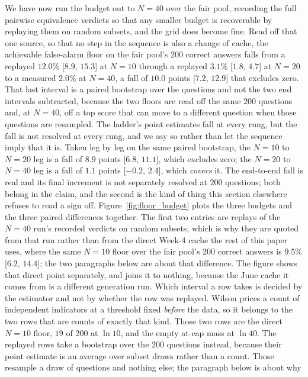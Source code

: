We have now run the budget out to $N{=}40$ over the fair pool, recording the full pairwise
equivalence verdicts so that any smaller budget is recoverable by replaying them on random
subsets, and the grid does become fine. Read off that one source, so that no step in the
sequence is also a change of cache, the achievable false-alarm floor on the fair pool's $200$
correct answers falls from a replayed $12.0\%$ [$8.9$, $15.3$] at $N{=}10$ through a replayed
$3.1\%$ [$1.8$, $4.7$] at $N{=}20$ to a measured $2.0\%$ at $N{=}40$, a fall of
$10.0$ points [$7.2$, $12.9$] that excludes zero. That last interval is a paired bootstrap
over the questions and not the two end intervals subtracted, because the two floors are read
off the same $200$ questions and, at $N{=}40$, off a top score that can move to a different
question when those questions are resampled. The ladder's point estimates fall at every rung,
but the fall is not resolved at every rung, and we say so rather than let the sequence imply
that it is. Taken
leg by leg on the same paired bootstrap, the $N{=}10$ to $N{=}20$ leg is a fall of $8.9$
points [$6.8$, $11.1$], which excludes zero; the $N{=}20$ to $N{=}40$ leg is a fall of $1.1$
points [$-0.2$, $2.4$], which \emph{covers} it. The end-to-end fall is real and its final
increment is not separately resolved at $200$ questions; both belong in the claim, and the
second is the kind of thing this section elsewhere refuses to read a sign off.
Figure~\ref{fig:floor_budget} plots the three budgets and the three paired differences
together. The first two entries are replays of the
$N{=}40$ run's recorded verdicts on random subsets, which is why they are quoted from that
run rather than from the direct Week-4 cache the rest of this paper uses, where the same
$N{=}10$ floor over the fair pool's $200$ correct answers is $9.5\%$ [$6.2$, $14.4$]; the two
paragraphs below are about that difference. The figure shows that direct point separately,
and joins it to nothing, because the June cache it comes from is a different generation run.
Which interval a row takes is decided by the
estimator and not by whether the row was replayed. Wilson prices a count of independent
indicators at a threshold fixed \emph{before} the data, so it belongs to the two rows that
are counts of exactly that kind. Those two rows are the direct $N{=}10$ floor, $19$ of
$200$ at $\ln 10$, and the empty
at-cap mass at $\ln 40$. The replayed rows take a bootstrap over the $200$ questions instead,
because their point estimate is an average over subset draws rather than a count. Those
resample a draw of questions and nothing else; the paragraph below is about why
